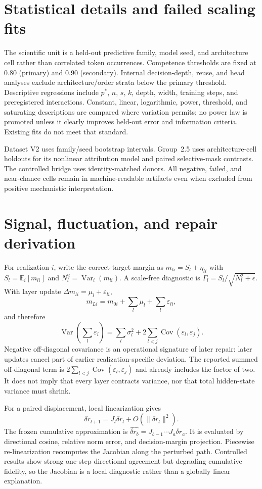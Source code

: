 \section{Statistical details and failed scaling fits}
The scientific unit is a held-out predictive family, model seed, and architecture cell rather than correlated token occurrences. Competence thresholds are fixed at 0.80 (primary) and 0.90 (secondary). Internal decision-depth, reuse, and head analyses exclude architecture/order strata below the primary threshold. Descriptive regressions include $p^*$, $n$, $s$, $k$, depth, width, training steps, and preregistered interactions. Constant, linear, logarithmic, power, threshold, and saturating descriptions are compared where variation permits; no power law is promoted unless it clearly improves held-out error and information criteria. Existing fits do not meet that standard.

Dataset V2 uses family/seed bootstrap intervals. Group~2.5 uses architecture-cell holdouts for its nonlinear attribution model and paired selective-mask contrasts. The controlled bridge uses identity-matched donors. All negative, failed, and near-chance cells remain in machine-readable artifacts even when excluded from positive mechanistic interpretation.

\section{Signal, fluctuation, and repair derivation}
For realization $i$, write the correct-target margin as $m_{li}=S_l+\eta_{li}$ with $S_l=\mathbb E_i[m_{li}]$ and $N_l^2=\operatorname{Var}_i(m_{li})$.  A scale-free diagnostic is $\Gamma_l=S_l/\sqrt{N_l^2+\epsilon}$.  With layer update $\Delta m_{li}=\mu_l+\varepsilon_{li}$,
\[
m_{Li}=m_{0i}+\sum_l\mu_l+\sum_l\varepsilon_{li},
\]
and therefore
\[
\operatorname{Var}\!\left(\sum_l\varepsilon_l\right)
=\sum_l\sigma_l^2+2\sum_{l<j}\operatorname{Cov}(\varepsilon_l,\varepsilon_j).
\]
Negative off-diagonal covariance is an operational signature of later repair: later updates cancel part of earlier realization-specific deviation. The reported summed off-diagonal term is $2\sum_{l<j}\operatorname{Cov}(\varepsilon_l,\varepsilon_j)$ and already includes the factor of two. It does not imply that every layer contracts variance, nor that total hidden-state variance must shrink.

For a paired displacement, local linearization gives
\[
\delta r_{l+1}=J_l\delta r_l+O(\|\delta r_l\|^2).
\]
The frozen cumulative approximation is $\widehat{\delta r_b}=J_{b-1}\cdots J_a\delta r_a$.  It is evaluated by directional cosine, relative norm error, and decision-margin projection. Piecewise re-linearization recomputes the Jacobian along the perturbed path. Controlled results show strong one-step directional agreement but degrading cumulative fidelity, so the Jacobian is a local diagnostic rather than a globally linear explanation.

